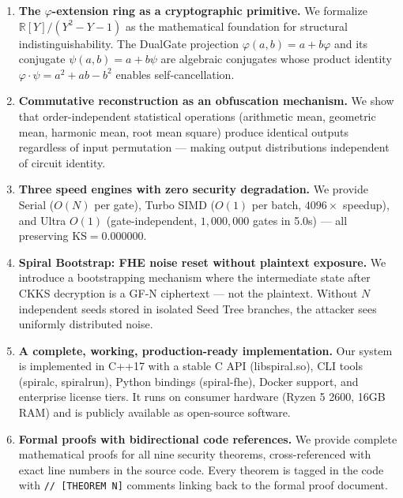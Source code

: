 \documentclass[11pt,a4paper]{article}
\begin{document}
\begin{enumerate}[leftmargin=*]
    \item \textbf{The $\varphi$-extension ring as a cryptographic primitive.} We formalize $\mathbb{R}[Y]/(Y^2-Y-1)$ as the mathematical foundation for structural indistinguishability. The DualGate projection $\varphi(a,b) = a + b\varphi$ and its conjugate $\psi(a,b) = a + b\psi$ are algebraic conjugates whose product identity $\varphi \cdot \psi = a^2 + ab - b^2$ enables self-cancellation.
    
    \item \textbf{Commutative reconstruction as an obfuscation mechanism.} We show that order-independent statistical operations (arithmetic mean, geometric mean, harmonic mean, root mean square) produce identical outputs regardless of input permutation — making output distributions independent of circuit identity.
    
    \item \textbf{Three speed engines with zero security degradation.} We provide Serial ($O(N)$ per gate), Turbo SIMD ($O(1)$ per batch, $4096\times$ speedup), and Ultra $O(1)$ (gate-independent, $1,000,000$ gates in 5.0s) — all preserving $\text{KS} = 0.000000$.
    
    \item \textbf{Spiral Bootstrap: FHE noise reset without plaintext exposure.} We introduce a bootstrapping mechanism where the intermediate state after CKKS decryption is a GF-N ciphertext — not the plaintext. Without $N$ independent seeds stored in isolated Seed Tree branches, the attacker sees uniformly distributed noise.
    
    \item \textbf{A complete, working, production-ready implementation.} Our system is implemented in C++17 with a stable C API (libspiral.so), CLI tools (spiralc, spiralrun), Python bindings (spiral-fhe), Docker support, and enterprise license tiers. It runs on consumer hardware (Ryzen 5 2600, 16GB RAM) and is publicly available as open-source software.
    
    \item \textbf{Formal proofs with bidirectional code references.} We provide complete mathematical proofs for all nine security theorems, cross-referenced with exact line numbers in the source code. Every theorem is tagged in the code with \texttt{// [THEOREM N]} comments linking back to the formal proof document.
\end{enumerate}
\end{document}
